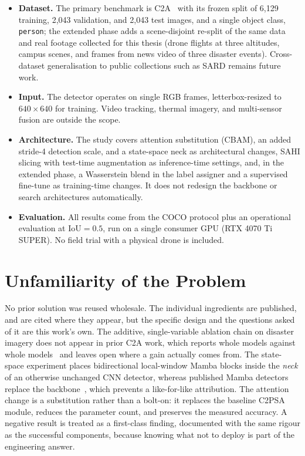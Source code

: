 \begin{itemize}
  \item \textbf{Dataset.} The primary benchmark is C2A~\cite{nihal2024c2a}
        with its frozen split of 6{,}129 training, 2{,}043 validation, and
        2{,}043 test images, and a single object class, \texttt{person}; the
        extended phase adds a scene-disjoint re-split of the same data and
        real footage collected for this thesis (drone flights at three
        altitudes, campus scenes, and frames from news video of three
        disaster events). Cross-dataset generalisation to public collections
        such as SARD remains future work.
  \item \textbf{Input.} The detector operates on single RGB frames,
        letterbox-resized to $640 \times 640$ for training. Video tracking,
        thermal imagery, and multi-sensor fusion are outside the scope.
  \item \textbf{Architecture.} The study covers attention substitution
        (CBAM), an added stride-4 detection scale, and a state-space neck as
        architectural changes, SAHI slicing with test-time augmentation as
        inference-time settings, and, in the extended phase, a Wasserstein
        blend in the label assigner and a supervised fine-tune as
        training-time changes. It does not redesign the backbone or search
        architectures automatically.
  \item \textbf{Evaluation.} All results come from the COCO protocol plus an
        operational evaluation at $\mathrm{IoU} = 0.5$, run on a single
        consumer GPU (RTX 4070 Ti SUPER). No field trial with a physical
        drone is included.
\end{itemize}

\section{Unfamiliarity of the Problem}
No prior solution was reused wholesale. The individual ingredients are
published, and are cited where they appear, but the specific design and the
questions asked of it are this work's own. The additive, single-variable
ablation chain on disaster imagery does not appear in prior C2A work, which
reports whole models against whole models~\cite{nihal2024c2a} and leaves open
where a gain actually comes from. The state-space experiment places
bidirectional local-window Mamba blocks inside the \emph{neck} of an
otherwise unchanged CNN detector, whereas published Mamba detectors replace
the backbone~\cite{wang2025mambayolo}, which prevents a like-for-like
attribution. The attention change is a substitution rather than a bolt-on: it
replaces the baseline C2PSA module, reduces the parameter count, and preserves
the measured accuracy. A negative result is treated as a first-class finding,
documented with
the same rigour as the successful components, because knowing what not to
deploy is part of the engineering answer.

